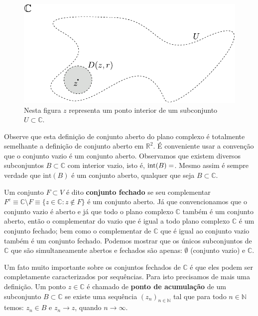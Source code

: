 \begin{figure}[H]
\centering
\includegraphics[scale=0.8]{Figuras/ponto-interior}
\caption{Nesta figura $z$ representa um ponto interior de um subconjunto $U\subset \mathbb{C}$.}
\label{fig:ponto-interior}
\end{figure}


Observe que esta definição de conjunto aberto do plano complexo é totalmente semelhante a definição de 
conjunto aberto em $\mathbb{R}^2$. É conveniente usar a convenção que o conjunto vazio é um conjunto aberto.
Observamos que existem diversos subconjuntos $B\subset \mathbb{C}$ com interior vazio, isto é, 
$\mathrm{int}(B)=\empty$. Mesmo assim é sempre verdade que $\mathrm{int}(B)$ é um conjunto
aberto, qualquer que seja $B\subset \mathbb{C}$. 

\medskip 

Um conjunto $F\subset V$ é dito {\bf conjunto fechado} se seu 
complementar $F^c\equiv \mathbb{C}\setminus F \equiv \{z\in \mathbb{C}: z\notin F\}$
é um conjunto aberto. 
Já que convencionamos que o conjunto vazio é aberto e já que todo o plano complexo $\mathbb{C}$
também é um conjunto aberto, então o complementar do vazio que é igual a todo plano complexo $\mathbb{C}$ é
um conjunto fechado; bem como o complementar de $\mathbb{C}$ que é igual ao conjunto vazio também é um conjunto
fechado. Podemos mostrar que os únicos subconjuntos de $\mathbb{C}$ que são simultaneamente abertos e fechados
são apenas: $\emptyset$ (conjunto vazio) e $\mathbb{C}$.

Um fato muito importante sobre os conjuntos fechados de $\mathbb{C}$ é que eles 
podem ser completamente caracterizados por sequências. Para isto precisamos de mais uma definição.
Um ponto $z\in\mathbb{C}$ é chamado de {\bf ponto de acumulação} de
um subconjunto $B\subset\mathbb{C}$ se existe uma sequência $(z_n)_{n\in\mathbb{N}}$
tal que para todo $n\in\mathbb{N}$ temos: $z_n\in B$ e $z_n\to z$,
quando $n\to\infty$. 


